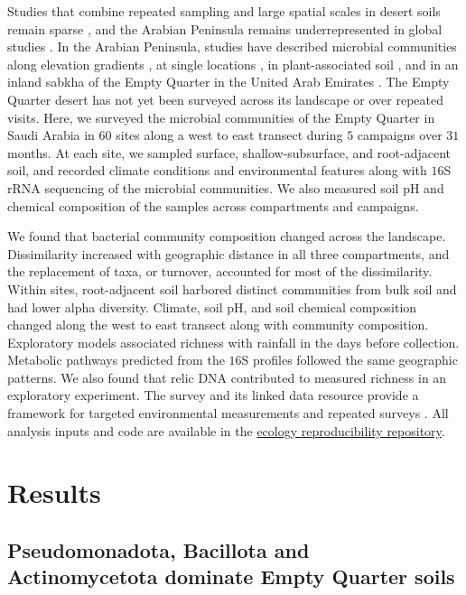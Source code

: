 \documentclass[fleqn,10pt,numbers]{olplainarticle}
\begin{document}
Studies that combine repeated sampling and large spatial scales in desert soils remain sparse \cite{yuan2017experimental}, and the Arabian Peninsula remains underrepresented in global studies \cite{maestre2015increasing, blancosacristan2025biocrust}. In the Arabian Peninsula, studies have described microbial communities along elevation gradients \cite{yasir2015elevation}, at single locations \cite{khan2020saudi}, in plant-associated soil \cite{osman2016jizan,eida2018desertplants,jalal2022saudi}, and in an inland sabkha of the Empty Quarter in the United Arab Emirates \cite{mckay2016sabkha}. The Empty Quarter desert has not yet been surveyed across its landscape or over repeated visits. Here, we surveyed the microbial communities of the Empty Quarter in Saudi Arabia in $60$ sites along a west to east transect during $5$ campaigns over $31$ months. At each site, we sampled surface, shallow-subsurface, and root-adjacent soil, and recorded climate conditions and environmental features along with $16$S rRNA sequencing of the microbial communities. We also measured soil pH and chemical composition of the samples across compartments and campaigns.



We found that bacterial community composition changed across the landscape. Dissimilarity increased with geographic distance in all three compartments, and the replacement of taxa, or turnover, accounted for most of the dissimilarity. Within sites, root-adjacent soil harbored distinct communities from bulk soil and had lower alpha diversity. Climate, soil pH, and soil chemical composition changed along the west to east transect along with community composition. Exploratory models associated richness with rainfall in the days before collection. Metabolic pathways predicted from the $16$S profiles followed the same geographic patterns. We also found that relic DNA contributed to measured richness in an exploratory experiment. The survey and its linked data resource provide a framework for targeted environmental measurements and repeated surveys \cite{rubalkhali_datapaper}. All analysis inputs and code are available in the \href{https://github.com/bio-ontology-research-group/empty-quarter-ecology}{ecology reproducibility repository}.


\section*{Results}
\subsection*{Pseudomonadota, Bacillota and Actinomycetota dominate Empty Quarter soils}
\end{document}
